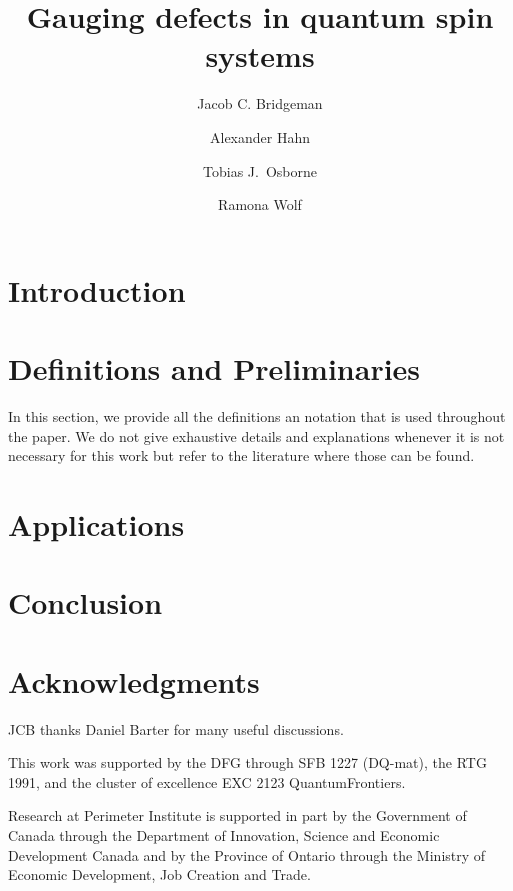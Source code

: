 

\title{Gauging defects in quantum spin systems}
\author{Jacob C. Bridgeman}
\author{Alexander Hahn}
\author{Tobias J.\ Osborne}
\author{Ramona Wolf}

\address{Perimeter Institute for Theoretical Physics, Waterloo, Ontario, Canada}
\address{Institut für Theoretische Physik, Leibniz Universität Hannover, Hannover, Germany}


\newcommand{\jcb}[1]{\textcolor{blue}{#1}}



\maketitle

\begin{abstract}
	
\end{abstract}

\section{Introduction}


\section{Definitions and Preliminaries}
In this section, we provide all the definitions an notation that is used throughout the paper. We do not give exhaustive details and explanations whenever it is not necessary for this work but refer to the literature where those can be found.







\section{Applications}



\section{Conclusion}

\section*{Acknowledgments}
JCB thanks Daniel Barter for many useful discussions.

This work was supported by the DFG through SFB 1227 (DQ-mat), the RTG 1991, and the cluster of excellence EXC 2123 QuantumFrontiers.

Research at Perimeter Institute is supported in part by the Government of Canada through the Department of Innovation, Science and Economic Development Canada and by the Province of Ontario through the Ministry of Economic Development, Job Creation and Trade.



